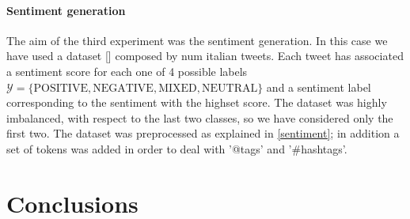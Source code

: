 \documentclass[10pt,twocolumn,letterpaper]{article}
\begin{document}
\paragraph{Sentiment generation} The aim of the third experiment was the sentiment generation.
In this case we have used a dataset [] composed by num italian tweets.
Each tweet has associated a sentiment score for each one of 4 possible labels
$\mathcal Y = \{\text{POSITIVE}, \text{NEGATIVE}, \text{MIXED}, \text{NEUTRAL}\}$ and a sentiment label corresponding
to the sentiment with the highset score. 
The dataset was highly imbalanced, with respect to the last two classes, so we have considered only the first two.
The dataset was preprocessed as explained in \ref{sentiment}; in addition a set of tokens was added in order to deal
with '@tags' and '#hashtags'.



\section{Conclusions}



\end{document}
